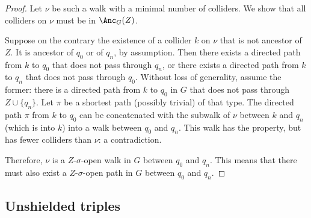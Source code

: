 \begin{proof}
  Let $\nu$ be such a walk with a minimal number of colliders.
  We show that all colliders on $\nu$ must be in $\Anc_{G}(Z)$. 

  Suppose on the contrary the existence of a collider $k$ on $\nu$ that is not ancestor of $Z$. 
  It is ancestor of $q_0$ or of $q_n$, by assumption.
  Then there exists a directed path from $k$ to $q_0$ that does not pass through $q_n$, or there exists a directed path from $k$ to $q_n$ that does not pass through $q_0$.
  Without loss of generality, assume the former:
  there is a directed path from $k$ to $q_0$ in $G$ that does not pass through $Z \cup \{q_n\}$.
  Let $\pi$ be a shortest path (possibly trivial) of that type.
  The directed path $\pi$ from $k$ to $q_0$ can be concatenated with the subwalk of $\nu$ between $k$ and $q_n$ (which is into $k$) into a walk between $q_0$ and $q_n$.
  This walk has the property, but has fewer colliders than $\nu$: a contradiction.

  Therefore, $\nu$ is a $Z$-$\sigma$-open walk in $G$ between $q_0$ and $q_n$.
  This means that there must also exist a $Z$-$\sigma$-open path in $G$ between $q_0$ and $q_n$.
\end{proof}

\subsection{Unshielded triples}

